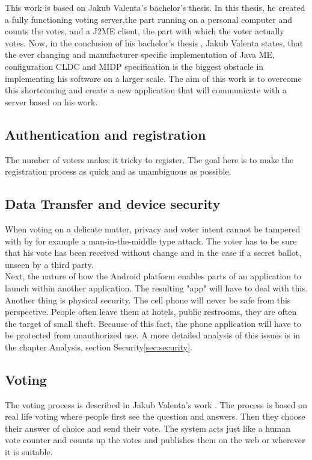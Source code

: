 \documentclass[11pt,twoside,a4paper]{book}
\begin{document}
This work is based on Jakub Valenta's bachelor's thesis\cite{bakalarkaJV}. In this thesis, he created a fully functioning voting server,the part running on a personal computer and counts the votes, and a J2ME client, the part with which the voter actually votes. Now, in the conclusion of his bachelor's thesis , Jakub Valenta \cite{bakalarkaJV} states, that the ever changing and manufacturer specific implementation of Java ME, configuration CLDC and MIDP specification is the biggest obstacle in implementing his software on a larger scale.  The aim of this work is to overcome this shortcoming and create a new application that will communicate with a server based on his work. 

\subsection{Authentication and registration}
The number of voters makes it tricky to register. The goal here is to make the registration process as quick and as unambiguous as possible.
\subsection{Data Transfer and device security}
When voting on a delicate matter, privacy and voter intent cannot be tampered with by for example a man-in-the-middle type attack. The voter has to be sure that his vote has been received without change and in the case if a secret ballot, unseen by a third party. \\
Next, the nature of how the Android platform enables parts of an application to launch within another application. The resulting "app" will have to deal with this.\\
Another thing is physical security. The cell phone will never be safe from this perspective. People often leave them at hotels, public restrooms, they are often the target of small theft. Because of this fact, the phone application will have to be protected from unauthorized use. A more detailed analysis of this issues is in the chapter Analysis, section Security\ref{sec:security}.   \\
\subsection{Voting}
The voting process is described in Jakub Valenta's work \cite{bakalarkaJV} . The process is based on real life voting where people first see the question and answers. Then they choose their answer of choice and send their vote. The system acts just like a human vote counter and counts up the votes and publishes them on the web or wherever it is suitable. 
\end{document}
